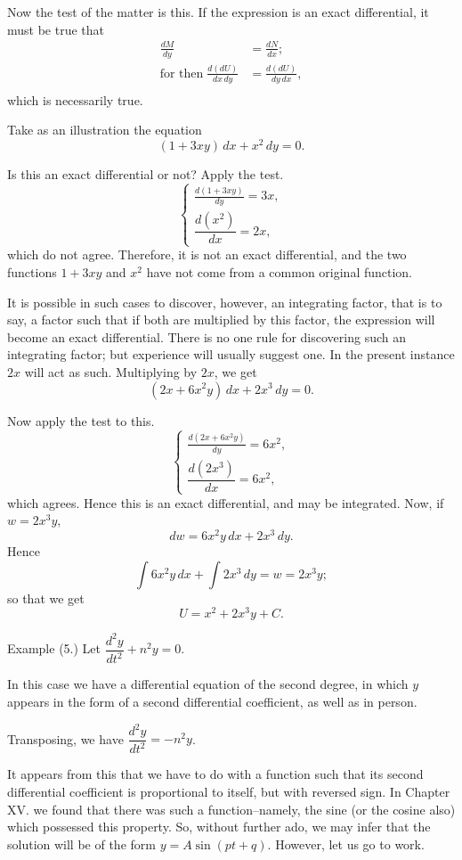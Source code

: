 \documentclass{ximera}
\begin{document}
Now the test of the matter is this. If the expression
is an exact differential, it must be true that
\begin{align*}
        \frac{dM}{dy} &= \frac{dN}{dx}; \\
\text{for then}\;
\frac{d(dU)}{dx\, dy} &= \frac{d(dU)}{dy\, dx},\\
\end{align*}
 which is necessarily true.

Take as an illustration the equation
\[
(1 + 3 xy)\, dx + x^2\, dy = 0.
\]

Is this an exact differential or not? Apply the
test.
\[\left\{
  \begin{aligned}
  \frac{d(1 + 3xy)}{dy}=3x, \\
  \dfrac{d(x^2)}{dx} = 2x,
  \end{aligned}
\right.
\]
which do not agree. Therefore, it is not an exact
differential, and the two functions $1+3xy$ and $x^2$
have not come from a common original function.

It is possible in such cases to discover, however, an
integrating factor, that is to say, a factor such that
if both are multiplied by this factor, the expression
will become an exact differential. There is no one
rule for discovering such an integrating factor; but
experience will usually suggest one. In the present
instance $2x$ will act as such. Multiplying by $2x$, we
get
\[
(2x + 6x^2y)\, dx + 2x^3\, dy = 0.
\]

Now apply the test to this.
\[
\left\{
  \begin{aligned}
 \frac{d(2x + 6x^2y)}{dy}=6x^2, \\
 \dfrac{d(2x^3)}{dx} = 6x^2,
  \end{aligned}
\right.
\]
which agrees. Hence this is an exact differential, and
may be integrated. Now, if $w = 2x^3y$,
\[
dw=6x^2y\, dx + 2x^3\, dy.
\]
   Hence
   \[
\int 6x^2y\, dx + \int 2x^3\, dy=w=2x^3y;
\]
 so that we get
\[
 U = x^2 + 2x^3y + C.
\]


Example (5.) Let $\dfrac{d^2 y}{dt^2} + n^2 y = 0$.

In this case we have a differential equation of the
second degree, in which $y$ appears in the form of
a second differential coefficient, as well as in person.

Transposing, we have $\dfrac{d^2 y}{dt^2} = - n^2 y$.

It appears from this that we have to do with a
function such that its second differential coefficient is
proportional to itself, but with reversed sign. In
Chapter XV. we found that there was such a function–namely,
the sine (or the cosine also) which
possessed this property. So, without further ado,
we may infer that the solution will be of the form
$y = A \sin (pt + q)$. However, let us go to work.
\end{document}
